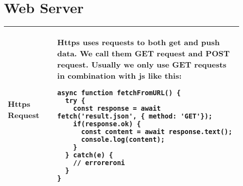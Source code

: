 \documentclass[main.tex,fontsize=8pt,paper=a4,paper=portrait,DIV=calc,]{scrartcl}
\begin{document}
\begin{table}[ht!]
\section{Web Server}
\begin{tabular}{|m{0.2\linewidth}|m{0.755\linewidth}|}
\hline
Https Request & 
Https uses requests to both get and push data.\newline
We call them \textbf{GET request} and \textbf{POST request}.\newline
Usually we only use GET requests in combination with js like this:\newline
\begin{lstlisting}
async function fetchFromURL() {
  try {
    const response = await fetch('result.json', { method: 'GET'});
    if(response.ok) {
      const content = await response.text();
      console.log(content);
    }
  } catch(e) {
    // erroreroni
  }
}
\end{lstlisting}\\
\hline
\end{tabular}
\end{table}
\end{document}
